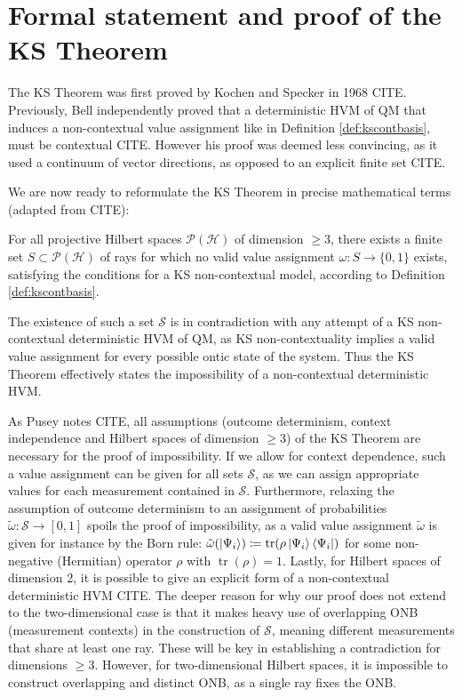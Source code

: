 \section{Formal statement and proof of the KS Theorem}
\label{sec:formalproof}

The KS Theorem was first proved by Kochen and Specker in 1968 CITE. Previously, Bell independently proved that a deterministic HVM of QM that induces a non-contextual value assignment like in Definition \ref{def:kscontbasis}, must be contextual CITE. However his proof was deemed less convincing, as it used a continuum of vector directions, as opposed to an explicit finite set CITE.

We are now ready to reformulate the KS Theorem in precise mathematical terms (adapted from CITE):

\begin{theorem}\hfill\break
\label{thm:ksthm}
For all projective Hilbert spaces $\mathcal{P}(\mathcal{H})$ of dimension $\geq3$, there exists a finite set $S\subset\mathcal{P}(\mathcal{H})$ of rays for which no valid value assignment $\omega:S\rightarrow\{0,1\}$ exists, satisfying the conditions for a KS non-contextual model, according to Definition \ref{def:kscontbasis}.
\end{theorem}

The existence of such a set $\mathcal{S}$ is in contradiction with any attempt of a KS non-contextual deterministic HVM of QM, as KS non-contextuality implies a valid value assignment for every possible ontic state of the system. Thus the KS Theorem effectively states the impossibility of a non-contextual deterministic HVM. 

As Pusey notes CITE, all assumptions (outcome determinism, context independence and Hilbert spaces of dimension $\ge3$) of the KS Theorem are necessary for the proof of impossibility. If we allow for context dependence, such a value assignment can be given for all sets $\mathcal{S}$, as we can assign appropriate values for each measurement contained in $\mathcal{S}$. Furthermore, relaxing the assumption of outcome determinism to an assignment of probabilities $\tilde{\omega}:\mathcal{S}\rightarrow\left[0,1\right]$ spoils the proof of impossibility, as a valid value assignment $\tilde{\omega}$ is given for instance by the Born rule: $\tilde{\omega}(\ket{\Psi_{i}} )\coloneqq\operatorname{tr}(\rho\ket{\Psi_{i}} \bra{\Psi_{i}})$ for some non-negative (Hermitian) operator $\rho$ with $\operatorname{tr}(\rho)=1$. Lastly, for Hilbert spaces of dimension 2, it is possible to give an explicit form of a non-contextual deterministic HVM CITE. The deeper reason for why our proof does not extend to the two-dimensional case is that it makes heavy use of overlapping ONB (measurement contexts) in the construction of $\mathcal{S}$, meaning different measurements that share at least one ray. These will be key in establishing a contradiction for dimensions $\geq3$. However, for two-dimensional Hilbert spaces, it is impossible to construct overlapping and distinct ONB, as a single ray fixes the ONB.

